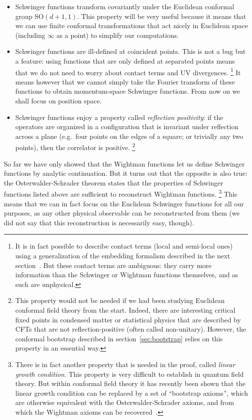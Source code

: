 \documentclass[a4paper,12pt]{article}
\newcommand{\SO}{\text{SO}}
\numberwithin{equation}{section}
\begin{document}
\begin{itemize}

\item
Schwinger functions transform covariantly under the Euclidean conformal group $\SO(d+1, 1)$. This property will be very useful because it means that we can use finite conformal transformations that act nicely in Euclidean space (including $\infty$ as a point) to simplify our computations.

\item
Schwinger functions are ill-defined at coincident points. This is not a bug but a feature: using functions that are only defined at separated points means that we do not need to worry about contact terms and UV divergences.%
%
\footnote{It is in fact possible to describe contact terms (local and semi-local ones) using a generalization of the embedding formalism described in the next section~\cite{Nakayama:2019mpz}. But these contact terms are ambiguous: they carry more information than the Schwinger or Wightman functions themselves, and as such are unphysical.}
%
It means however that we cannot simply take the Fourier transform of these functions to obtain momentum-space Schwinger functions. From now on we shall focus on position space. 

\item
Schwinger functions enjoy a property called \emph{reflection positivity}: if the operators are organized in a configuration that is invariant under reflection across a plane (e.g.~four points on the edges of a square; or trivially any two points), then the correlator is positive.%
%
\footnote{This property would not be needed if we had been studying Euclidean conformal field theory from the start. Indeed, there are interesting critical fixed points in condensed matter or statistical physics that are described by CFTs that are not reflection-positive (often called non-unitary).
However, the conformal bootstrap described in section~\ref{sec:bootstrap} relies on this property in an essential way.}
%

\end{itemize}

So far we have only showed that the Wightman functions let us define Schwinger functions by analytic continuation. But it turns out that the opposite is also true: the Osterwalder-Schrader theorem states that the properties of Schwinger functions listed above are sufficient to reconstruct Wightman functions.%
%
\footnote{There is in fact another property that is needed in the proof, called \emph{linear growth condition}. This property is very difficult to establish in quantum field theory. But within conformal field theory it has recently been shown that the linear growth condition can be replaced by a set of ``bootstrap axioms'', which are otherwise equivalent with the Osterwalder-Schrader axioms, and from which the Wightman axioms can be recovered~\cite{Kravchuk:2020scc, Kravchuk:2021kwe}.}
%
This means that we can in fact focus on the Euclidean Schwinger functions for all our purposes, as any other physical observable can be reconstructed from them (we did not say that this reconstruction is necessarily easy, though).
\end{document}

